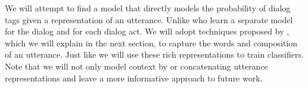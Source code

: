 
We will attempt to find a model that directly models the probability of dialog tags given a representation of an utterance. Unlike  who learn a separate model for the dialog and for each dialog act. We will adopt techniques proposed by , which we will explain in the next section, to capture the words and composition of an utterance. Just like  we will use these rich representations to train classifiers. Note that we will not only model context by or concatenating utterance representations and leave a more informative approach to future work.